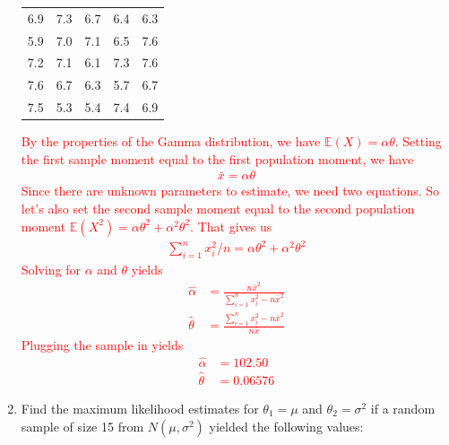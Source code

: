 \documentclass[12pt]{article} %
\begin{document}
\begin{enumerate}
\begin{center}
\begin{tabular}{ccccc}
6.9 & 7.3 & 6.7 & 6.4 & 6.3 \\
5.9 & 7.0 & 7.1 & 6.5 & 7.6 \\
7.2 & 7.1 & 6.1 & 7.3 & 7.6 \\
7.6 & 6.7 & 6.3 & 5.7 & 6.7 \\
7.5 & 5.3 & 5.4 & 7.4 & 6.9 \\
\end{tabular}
\end{center}
\textcolor{red}{By the properties of the Gamma distribution, we have $\mathbb{E}(X) = \alpha \theta$. Setting the first sample moment equal to the first population moment, we have $$\begin{aligned}
    \bar{x} = \alpha \theta 
\end{aligned}$$ Since there are unknown parameters to estimate, we need two equations. So let's also set the second sample moment equal to the second population moment $\mathbb{E}(X^2) = \alpha \theta^2 + \alpha^2 \theta^2$. That gives us $$\begin{aligned}
    \sum_{i=1}^n x_i^2/n = \alpha \theta^2 + \alpha^2 \theta^2
\end{aligned}$$ Solving for $\alpha$ and $\theta$ yields $$\begin{aligned}
    \hat \alpha &= \frac{n \bar{x}^2}{\sum_{i=1}^n x_i^2 - n\bar{x}^2} \\
    \hat \theta &= \frac{\sum_{i=1}^n x_i^2 - n \bar{x}^2}{n \bar{x}}
\end{aligned}$$Plugging the sample in yields $$\begin{aligned}
    \hat \alpha &= 102.50 \\
    \hat \theta &= 0.06576
\end{aligned}$$}

\newpage
\item Find the maximum likelihood estimates for $\theta_1=\mu$
and $\theta_2 = \sigma^2$ if a random sample of size 15 from $N(\mu,\sigma^2)$
yielded the following values:


\end{enumerate}
\end{document}
